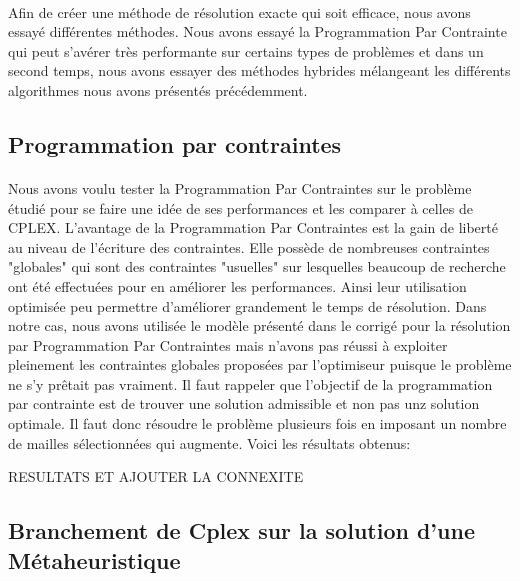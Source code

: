 \documentclass[a4paper, 11pt]{article} %
\begin{document}
\paragraph*{}
Afin de créer une méthode de résolution exacte qui soit efficace, nous avons essayé différentes méthodes. Nous avons essayé la Programmation Par Contrainte qui peut s'avérer très performante sur certains types de problèmes et dans un second temps, nous avons essayer des méthodes hybrides mélangeant les différents algorithmes nous avons présentés précédemment.

\subsection{Programmation par contraintes}

\paragraph*{}
Nous avons voulu tester la Programmation Par Contraintes sur le problème étudié pour se faire une idée de ses performances et les comparer à celles de CPLEX. L'avantage de la Programmation Par Contraintes est la gain de liberté au niveau de l'écriture des contraintes. Elle possède de nombreuses contraintes "globales" qui sont des contraintes "usuelles" sur lesquelles beaucoup de recherche ont été effectuées pour en améliorer les performances. Ainsi leur utilisation optimisée peu permettre d'améliorer grandement le temps de résolution. Dans notre cas, nous avons utilisée le modèle présenté dans le corrigé pour la résolution par Programmation Par Contraintes mais n'avons pas réussi à exploiter pleinement les contraintes globales proposées par l'optimiseur puisque le problème ne s'y prêtait pas vraiment. Il faut rappeler que l'objectif de la programmation par contrainte est de trouver une solution admissible et non pas unz solution optimale. Il faut donc résoudre le problème plusieurs fois en imposant un nombre de mailles sélectionnées qui augmente. Voici les résultats obtenus:

RESULTATS ET AJOUTER LA CONNEXITE

\subsection{Branchement de Cplex sur la solution d'une Métaheuristique}
\end{document}
